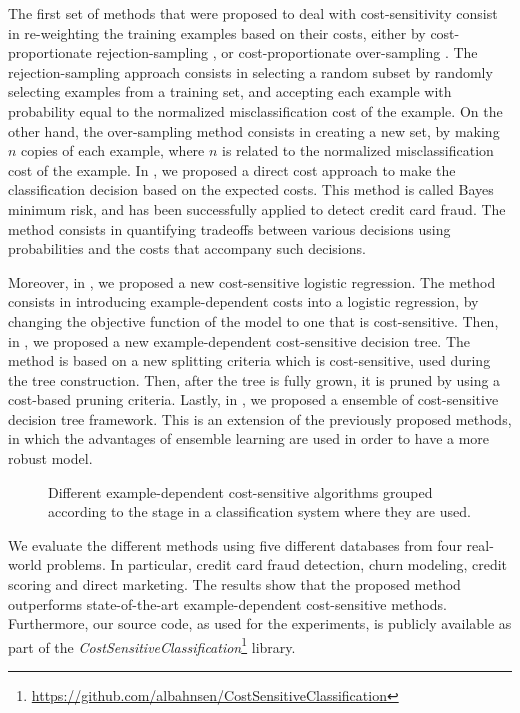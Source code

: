   The first set of methods that were proposed to deal with cost-sensitivity consist in 
  re-weighting the training examples based on their costs, either by cost-proportionate 
  rejection-sampling \citep{Zadrozny2003}, or cost-proportionate over-sampling \citep{Elkan2001}.
  The rejection-sampling approach consists in selecting a random subset by randomly 
  selecting examples from a training set, and accepting each example with probability equal to 
  the normalized misclassification cost of the example. On the other hand, the over-sampling 
  method consists in creating a new set, by making $n$ copies of each example, where $n$ is related 
  to the normalized misclassification cost of the example.
  In \citep{CorreaBahnsen2013,CorreaBahnsen2014}, we proposed a direct cost approach to make the 
  classification decision based on the expected costs. This method is called Bayes minimum risk, and 
  has been successfully applied to detect credit card fraud. The method   
  consists in quantifying tradeoffs between various decisions using probabilities and the costs   
  that accompany such decisions. 
  
  Moreover, in \citep{CorreaBahnsen2014b}, we proposed a new cost-sensitive logistic regression. 
  The   method consists in introducing example-dependent costs into a logistic regression, by 
  changing   the objective function of the model to one that is  cost-sensitive. 
  Then, in \citep{CorreaBahnsen2015}, we proposed a new example-dependent cost-sensitive decision 
  tree. The method is based on a new splitting criteria which is cost-sensitive, used during the 
  tree construction. Then, after the tree is fully grown, it is pruned by using a cost-based 
  pruning criteria. Lastly, in \citep{CorreaBahnsen2015b}, we proposed a ensemble of cost-sensitive 
  decision tree framework. This is an extension of the previously proposed methods, in which the 
  advantages of ensemble learning are used in order to have a more robust model.

  \begin{figure}
  \centering
  
  \caption{Different example-dependent cost-sensitive algorithms grouped according to the 
    stage in a classification system where they are used.}
  \label{fig:1:1}
  \end{figure}
  
  We evaluate the different methods using five different databases from four real-world problems. In 
  particular, credit card fraud detection, churn modeling, credit scoring and direct marketing. 
  The results show that the proposed method outperforms state-of-the-art  example-dependent   
  cost-sensitive methods. Furthermore, our source code, as used for the experiments, is publicly 
  available as part of the \textit{CostSensitiveClassification}\footnote{
  \url{https://github.com/albahnsen/CostSensitiveClassification}} library.
  
